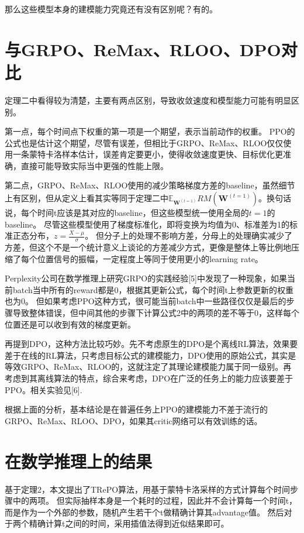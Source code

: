 \documentclass[11pt,english]{ctexart}
\newcommand{\Exp}{\mathbb{E}}
\newcommand{\Path}{\mathbf{W}}
\newcommand{\RM}{RM}
\begin{document}
那么这些模型本身的建模能力究竟还有没有区别呢？有的。

\section{与GRPO、ReMax、RLOO、DPO对比}
定理二中看得较为清楚，主要有两点区别，导致收敛速度和模型能力可能有明显区别。

第一点，每个时间点下权重的第一项是一个期望，表示当前动作的权重。
PPO的公式也是估计这个期望，尽管有误差，但相比于GRPO、ReMax、RLOO仅仅使用一条蒙特卡洛样本估计，误差肯定要更小，使得收敛速度更快、目标优化更准确，直接可能导致实际当中更强的性能上限。

第二点，GRPO、ReMax、RLOO使用的减少策略梯度方差的baseline，虽然细节上有区别，但从定义上看其实等同于定理二中$\Exp_{\Path^{(t=1)}}\RM(\Path^{(t=1)})$。换句话说，每个时间t应该是其对应的baseline，但这些模型统一使用全局的$t=1$的baseline。
尽管这些模型使用了梯度标准化，即将变换为均值为0、标准差为1的标准正态分布，$z=\frac{X-\mu}{\sigma}$。
但分子上的处理不影响方差，分母上的处理确实减少了方差，但这个不是一个统计意义上谈论的方差减少方式，更像是整体上等比例地压缩了每个位置信号的振幅，一定程度上等同于使用更小的learning rate。

Perplexity公司在数学推理上研究GRPO的实践经验[5]中发现了一种现象，如果当前batch当中所有的reward都是0，根据其更新公式，每个时间t上参数更新的权重也为0。
但如果考虑PPO这种方式，很可能当前batch中一些路径仅仅是最后的步骤导致整体错误，但中间其他的步骤下计算公式2中的两项的差不等于0，这样每个位置还是可以收到有效的梯度更新。

再提到DPO，这种方法比较巧妙。先不考虑原生的DPO是个离线RL算法，效果要差于在线的RL算法，只考虑目标公式的建模能力，DPO使用的原始公式，其实是等效GRPO、ReMax、RLOO的，这就注定了其理论建模能力属于同一级别。再考虑到其离线算法的特点，综合来考虑，DPO在广泛的任务上的能力应该要差于PPO。相关实验见[6].

根据上面的分析，基本结论是在普遍任务上PPO的建模能力不差于流行的GRPO、ReMax、RLOO、DPO，如果其critic网络可以有效训练的话。


\section{在数学推理上的结果}

基于定理2，本文提出了TRePO算法，用基于蒙特卡洛采样的方式计算每个时间步骤中的两项。
但实际抽样本身是一个耗时的过程，因此并不会计算每一个时间t，而是作为一个外部的参数，随机产生若干个t做精确计算其advantage值。
然后对于两个精确计算t之间的时间，采用插值法得到近似结果即可。
\end{document}
